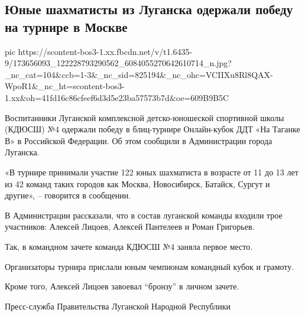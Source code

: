  
 
 
 
 

\subsection{Юные шахматисты из Луганска одержали победу на турнире в Москве}
\label{sec:14_04_2021.fb.respublikalnr.9.chess_pobeda_blitz_turnir_rossia}

\ifcmt
  pic https://scontent-bos3-1.xx.fbcdn.net/v/t1.6435-9/173656093_122228793290562_6084055270642610714_n.jpg?_nc_cat=104&ccb=1-3&_nc_sid=825194&_nc_ohc=VCIIXu8Rl8QAX-WpoR1&_nc_ht=scontent-bos3-1.xx&oh=41fd16c86cfeef6d3d5e23ba57573b7d&oe=609B9B5C
\fi

Воспитанники Луганской комплексной детско-юношеской спортивной школы (КДЮСШ) №4
одержали победу в блиц-турнире Онлайн-кубок ДДТ «На Таганке В» в Российской
Федерации. Об этом сообщили в Администрации города Луганска.

«В турнире принимали участие 122 юных шахматиста в возрасте от 11 до 13 лет из
42 команд таких городов как Москва, Новосибирск, Батайск, Сургут и другие», –
говорится в сообщении.

В Администрации рассказали, что в состав луганской команды входили трое
участников: Алексей Лицоев, Алексей Пантелеев и Роман Григорьев.

Так, в командном зачете команда КДЮСШ №4 заняла первое место.

Организаторы турнира прислали юным чемпионам командный кубок и грамоту.

Кроме того, Алексей Лицоев завоевал \enquote{бронзу} в личном зачете.

Пресс-служба Правительства Луганской Народной Республики

